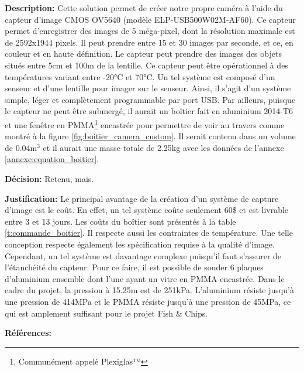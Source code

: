 \textbf{Description:} Cette solution permet de créer notre propre caméra à l'aide du capteur d'image CMOS OV5640 (modèle ELP-USB500W02M-AF60). Ce capteur permet d'enregistrer des images de 5 méga-pixel, dont la résolution maximale est de 2592x1944 pixels. Il peut prendre entre 15 et 30 images par seconde, et ce, en couleur et en haute définition. Le capteur peut prendre des images des objets situés entre 5cm et 100m de la lentille. Ce capteur peut être opérationnel à des températures variant entre -20°C et 70°C. Un tel système est composé d'un senseur et d'une lentille pour imager sur le senseur. Ainsi, il s'agit d'un système simple, léger et complètement programmable par port USB. Par ailleurs, puisque le capteur ne peut être submergé, il aurait un boîtier fait en aluminium 2014-T6 et une fenêtre en PMMA\footnote{Communément appelé Plexiglas™} encastrée pour permettre de voir au travers comme montré à la figure \ref{fig:boitier_camera_custom}. Il serait contenu dans un volume de 0.04m$^3$ et il aurait une masse totale de 2.25kg avec les données de l'annexe \ref{annexe:equation_boitier}.

\textbf{Décision:} Retenu, mais.

\textbf{Justification:} Le principal avantage de la création d'un système de capture d'image est le coût. En effet, un tel système coûte seulement 60\$ et est livrable entre 3 et 13 jours. Les coûts du boîtier sont présentés à la table \ref{t:commande_boitier}. Il respecte aussi les contraintes de température. Une telle conception respecte également les spécification requise à la qualité d'image. Cependant, un tel système est davantage complexe puisqu'il faut s'assurer de l'étanchéité du capteur. Pour ce faire, il est possible de souder 6 plaques d'aluminium ensemble dont l'une ayant un vitre en PMMA encastrée. Dans le cadre du projet, la pression à 15.25m est de 251kPa. L'aluminium résiste jusqu'à une pression de 414MPa et le PMMA résiste jusqu'à une pression de 45MPa, ce qui est amplement suffisant pour le projet Fish \& Chips.

\textbf{Références:} \cite{OV5640} \cite{OV5640_coûts} \cite{ASM} \cite{Glass}

\begin{table}[!htb]
\footnotesize
\centering
{}
\caption{Faisabilité des concepts pour capter les informations sur les poissons}
\label{t:Decision_capteur}
\end{table}

